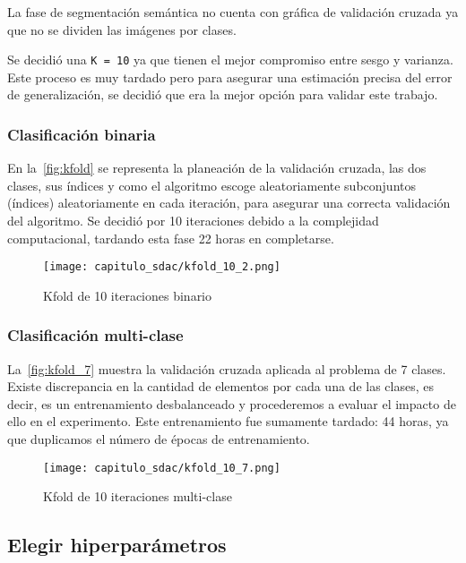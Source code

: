 La fase de segmentación semántica no cuenta con gráfica de validación cruzada ya
que no se dividen las imágenes por clases.

Se decidió una \texttt{K = 10} ya que tienen el mejor compromiso
entre sesgo y varianza. Este proceso es muy tardado pero para asegurar una
estimación precisa del error de generalización, se decidió que era la mejor
opción para validar este trabajo.

\subsubsection{Clasificación binaria}

En la~\autoref{fig:kfold} se representa la planeación de la validación cruzada,
las dos clases, sus índices y como el algoritmo escoge aleatoriamente
subconjuntos (índices) aleatoriamente en cada iteración, para asegurar una
correcta validación del algoritmo. Se decidió por 10 iteraciones debido a la
complejidad computacional, tardando esta fase 22 horas en completarse.

\begin{figure}[H]
    \centering
    \texttt{[image: capitulo\_sdac/kfold\_10\_2.png]}
    \caption{Kfold de 10 iteraciones binario}\label{fig:kfold}
\end{figure}

\subsubsection{Clasificación multi-clase}

La~\autoref{fig:kfold_7} muestra la validación cruzada aplicada al problema de 7
clases. Existe discrepancia en la cantidad de elementos por cada una de las
clases, es decir, es un entrenamiento desbalanceado y procederemos a evaluar el
impacto de ello en el experimento. Este entrenamiento fue sumamente tardado: 44
horas, ya que duplicamos el número de épocas de entrenamiento.

\begin{figure}[H]
    \centering
    \texttt{[image: capitulo\_sdac/kfold\_10\_7.png]}
    \caption{Kfold de 10 iteraciones multi-clase}\label{fig:kfold_7}
\end{figure}

\subsection{Elegir hiperparámetros}

